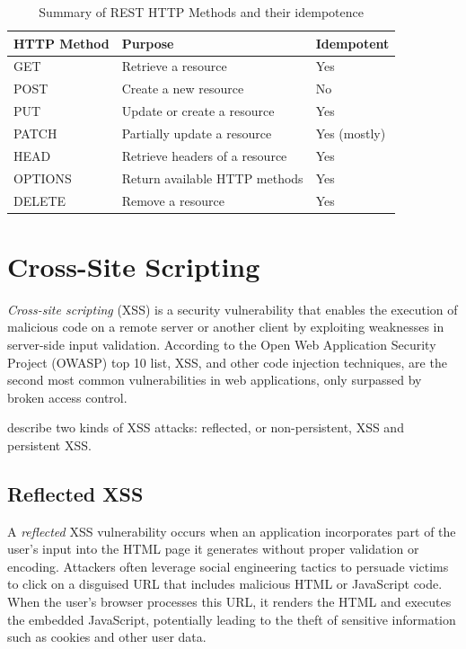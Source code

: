 \begin{table}[t]
    \centering
    \begin{tabular}{@{}lll@{}}
        \toprule
        \textbf{HTTP Method} & \textbf{Purpose}                         & \textbf{Idempotent} \\ \midrule
        GET                   & Retrieve a resource                     & Yes                 \\
        POST                  & Create a new resource                   & No                  \\
        PUT                   & Update or create a resource             & Yes                 \\
        PATCH                 & Partially update a resource             & Yes (mostly)        \\
        HEAD                  & Retrieve headers of a resource         & Yes                 \\
        OPTIONS               & Return available HTTP methods           & Yes                 \\
        DELETE                & Remove a resource                       & Yes                 \\ \bottomrule
    \end{tabular}
    \caption[List of HTTP Methods]{Summary of REST HTTP Methods and their idempotence \cite[chapter 9]{fielding_http_2022}}
    \label{tab:rest_http_methods}
\end{table}

\section{Cross-Site Scripting}
\label{sec:xss}
\textit{Cross-site scripting} (XSS) is a security vulnerability that enables the execution of malicious code on a remote server or
another client by exploiting weaknesses in server-side input validation. \cite{bisht_xss-guard_2008}
According to the Open Web Application Security Project (OWASP) top 10 list, XSS, and other code injection techniques, are the second most common vulnerabilities in web applications, only surpassed by broken access control.\cite{noauthor_owasp_2025}

\citet{kieyzun_automatic_2009} describe two kinds of XSS attacks: reflected, or non-persistent, XSS and persistent XSS.
\subsection{Reflected XSS}
A \textit{reflected} XSS vulnerability occurs when an application incorporates part of the user’s input into the HTML page it generates without proper validation or encoding. Attackers often leverage social engineering tactics to persuade victims to click on a disguised URL that includes malicious HTML or JavaScript code. When the user's browser processes this URL, it renders the HTML and executes the embedded JavaScript, potentially leading to the theft of sensitive information such as cookies and other user data.

